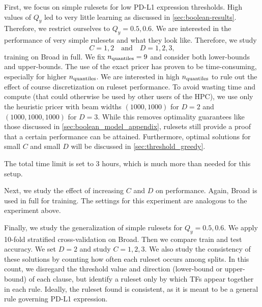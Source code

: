 First, we focus on simple rulesets for low PD-L1 expression thresholds.
High values of $Q_y$ led to very little learning as discussed in \autoref{sec:boolean-results}.
Therefore, we restrict ourselves to $Q_y = 0.5, 0.6.$
We are interested in the performance of very simple rulesets and what they look like.
Therefore, we study
\[C = 1,2 \quad \text{and} \quad D = 1,2,3,\]
training on Broad in full.
We fix $n_{\text{quantiles}} = 9$ and consider both lower-bounds and upper-bounds.
The use of the exact pricer has proven to be time-consuming, especially for higher $n_{\text{quantiles}}$.
We are interested in high $n_{\text{quantiles}}$ to rule out the effect of course discretization on ruleset performance.
To avoid wasting time and compute (that could otherwise be used by other users of the HPC),
we use only the heuristic pricer with beam widths $(1000,1000)$ for $D=2$ and $(1000,1000,1000)$ for $D=3.$
While this removes optimality guarantees like those discussed in \autoref{sec:boolean_model_appendix},
rulesets still provide a proof that a certain performance can be attained.
Furthermore, optimal solutions for small $C$ and small $D$ will be discussed in \autoref{sec:threshold_greedy}.

The total time limit is set to 3 hours, which is much more than needed for this setup.

Next, we study the effect of increasing $C$ and $D$ on performance.
Again, Broad is used in full for training.
The settings for this experiment are analogous to the experiment above.

Finally, we study the generalization of simple rulesets for $Q_y=0.5, 0.6.$
We apply 10-fold stratified cross-validation on Broad.
Then we compare train and test accuracy.
We set $D = 2$ and study $C=1,2,3$.
We also study the consistency of these solutions by counting how often each ruleset occurs among splits.
In this count, we disregard the threshold value and direction (lower-bound or upper-bound) of each clause,
but identify a ruleset only by which TFs appear together in each rule.
Ideally, the ruleset found is consistent, as it is meant to be a general rule governing PD-L1 expression.
